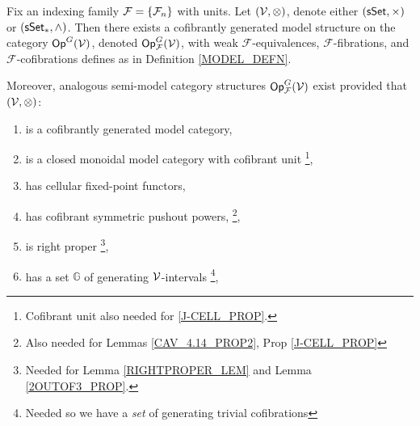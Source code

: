 \documentclass[a4paper,10pt
,draft
]{article}%
\renewcommand{\F}{\mathcal F}
\renewcommand{\1}{\eta}%
\begin{document}
\begin{theorem}
      \label{MODEL_THM}
      Fix an indexing family $\F = \set{\F_n}$ with units.
      Let $(\mathcal V, \otimes)$, denote either $(\mathsf{sSet}, \times)$ or $(\sSet_{\**}, \wedge)$.
      Then there exists a cofibrantly generated model structure on the category $\mathsf{Op}^G(\mathcal V)$,
      denoted $\Op^G_\F(\V)$, with
      weak $\F$-equivalences, $\F$-fibrations, and $\F$-cofibrations defines as in Definition \ref{MODEL_DEFN}.
           
      Moreover, analogous semi-model category structures $\Op^G_\F(\V)$ exist
      provided that $(\mathcal V, \otimes)$:
      \begin{enumerate}[label = (\roman*)]\itemsep-4pt
      \item is a cofibrantly generated model category,
      \item is a closed monoidal model category with cofibrant unit
            \footnote{Cofibrant unit also needed for \ref{J-CELL_PROP}.},
      \item has cellular fixed-point functors,
      \item \label{CSPP_LBL} has cofibrant symmetric pushout powers,
            \footnote{Also needed for Lemmas \ref{CAV_4.14_PROP2}, Prop \ref{J-CELL_PROP}}, %
      \item \label{RP_LBL} is right proper
            \footnote{Needed for Lemma \ref{RIGHTPROPER_LEM} and Lemma \ref{2OUTOF3_PROP}.},
      \item \label{GENSET_LBL} has a set $\mathbb{G}$ of generating $\mathcal V$-intervals
            \footnote{Needed so we have a \textit{set} of generating trivial cofibrations},
      \end{enumerate}
\end{theorem}
\end{document}
